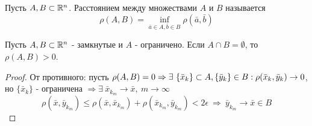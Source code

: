 \begin{definition}
    Пусть $A,B\subset \mathbb{R}^n$. Расстоянием между множествами $A$ и $B$ называется 
    \[\rho(A,B)=\inf\limits_{\bar{a}\in A,\bar{b}\in B}\rho(\bar{a}, \bar{b})\]
\end{definition} 
\begin{theorem}
    Пусть $A,B \subset \mathbb{R}^n$ - замкнутые и $A$ - ограничено. Если $A\cap B=\emptyset$, то $\rho(A,B)>0$. 
\end{theorem} 
\begin{proof}
    От противного: пусть $\rho(A,B)=0 \Rightarrow \exists\ \{\bar{x}_k\}\subset A,\\ \{\bar{y}_k\}\in B: \rho(\bar{x}_k, \bar{y}_k)\to 0$, но $\{\bar{x}_k\}$ - ограничена $\Rightarrow \exists\ \bar{x}_{k_m}\to \bar{x},\ m\to \infty$
    \[\rho(\bar{x}, \bar{y}_{k_m})\leq \rho(\bar{x}, \bar{x}_{k_m})+\rho(\bar{x}_{k_m}, \bar{y}_{k_m})<2\epsilon\ \Rightarrow\ \bar{y}_{k_m}\to \bar{x}\in B\]
\end{proof}

